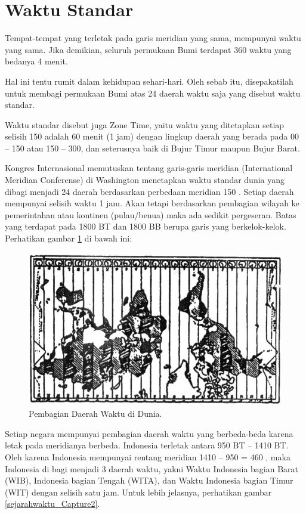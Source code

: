 \section{Waktu Standar}
Tempat-tempat yang terletak pada garis meridian yang sama, mempunyai waktu yang sama.
 Jika demikian, seluruh permukaan Bumi terdapat 360 waktu yang bedanya 4 menit.

 Hal ini tentu rumit dalam kehidupan sehari-hari. Oleh sebab itu, disepakatilah untuk
 membagi permukaan Bumi atas 24 daerah waktu saja yang disebut waktu standar.
 
 Waktu standar disebut juga Zone Time, yaitu waktu yang ditetapkan setiap 
 selisih 150 adalah 60 menit (1 jam) dengan lingkup daerah yang berada pada 00 – 150
 atau 150 – 300, dan seterusnya baik di Bujur Timur maupun Bujur Barat.

 Kongres Internasional memutuskan tentang garis-garis meridian (International Meridian Conferense) 
 di Washington menetapkan waktu standar dunia yang dibagi menjadi 24 daerah berdasarkan
 perbedaan meridian 150 . Setiap daerah mempunyai selisih waktu 1 jam.
 Akan tetapi berdasarkan pembagian wilayah ke pemerintahan atau kontinen (pulau/benua)
 maka ada sedikit pergeseran. Batas yang terdapat pada 1800 BT dan 1800 BB berupa garis
 yang berkelok-kelok. Perhatikan gambar \ref{sejarahwaktu_Capture1} di bawah ini:
 
 \begin{figure}[ht]
 \centerline{\includegraphics[width=1\textwidth]{figures/sejarahwaktu_dunia}}
 \caption{Pembagian Daerah Waktu di Dunia.}
 \label{sejarahwaktu_Capture1}
 \end{figure}
 

 
Setiap negara mempunyai pembagian daerah waktu yang berbeda-beda karena letak pada meridianya berbeda. 
 Indonesia terletak antara 950 BT – 1410 BT. Oleh karena Indonesia mempunyai rentang meridian 1410 – 950 = 460 , 
 maka Indonesia di bagi menjadi 3 daerah waktu, yakni Waktu Indonesia bagian Barat (WIB),
 Indonesia bagian Tengah (WITA), dan Waktu Indonesia bagian Timur (WIT) dengan selisih
 satu jam. Untuk lebih jelasnya, perhatikan gambar \ref{sejarahwaktu_Capture2}.

